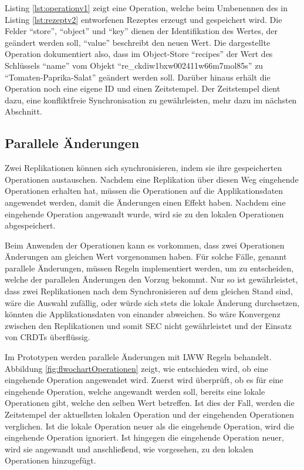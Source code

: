 \documentclass[a4paper, 12pt]{scrreprt}
\begin{document}
Listing \ref{lst:operationv1} zeigt eine Operation, welche beim Umbenennen des in Listing \ref{lst:rezeptv2} entworfenen Rezeptes erzeugt und gespeichert wird. Die Felder \enquote{store}, \enquote{object} und  \enquote{key} dienen der Identifikation des Wertes, der geändert werden soll, \enquote{value} beschreibt den neuen Wert. Die dargestellte Operation dokumentiert also, dass im Object-Store \enquote{recipes} der Wert des Schlüssels \enquote{name} vom Objekt \enquote{re\_ckdiw1bxw002411w66m7mol85s} zu \enquote{Tomaten-Paprika-Salat} geändert werden soll. Darüber hinaus erhält die Operation noch eine eigene ID und einen Zeitstempel. Der Zeitstempel dient dazu, eine konfliktfreie Synchronisation zu gewährleisten, mehr dazu im nächsten Abschnitt. 

\begin{minipage}{\linewidth}
	
\end{minipage}

\subsection{Parallele Änderungen}

Zwei Replikationen können sich synchronisieren, indem sie ihre gespeicherten Operationen austauschen. Nachdem eine Replikation über diesen Weg eingehende Operationen erhalten hat, müssen die Operationen auf die Applikationsdaten angewendet werden, damit die Änderungen einen Effekt haben. Nachdem eine eingehende Operation angewandt wurde, wird sie zu den lokalen Operationen abgespeichert.

Beim Anwenden der Operationen kann es vorkommen, dass zwei Operationen Änderungen am gleichen Wert vorgenommen haben. Für solche Fälle, genannt parallele Änderungen, müssen Regeln implementiert werden, um zu entscheiden, welche der parallelen Änderungen den Vorzug bekommt. Nur so ist gewährleistet, dass zwei Replikationen nach dem Synchronisieren auf dem gleichen Stand sind, wäre die Auswahl zufällig, oder würde sich stets die lokale Änderung durchsetzen, könnten die Applikationsdaten von einander abweichen. So wäre Konvergenz zwischen den Replikationen und somit \ac{SEC} nicht gewährleistet und der Einsatz von CRDTs überflüssig.

Im Prototypen werden parallele Änderungen mit \ac{LWW} Regeln behandelt. Abbildung \ref{fig:flwochartOperationen} zeigt, wie entschieden wird, ob eine eingehende Operation angewendet wird. Zuerst wird überprüft, ob es für eine eingehende Operation, welche angewandt werden soll, bereits eine lokale Operationen gibt, welche den selben Wert betreffen. Ist dies der Fall, werden die Zeitstempel der aktuellsten lokalen Operation und der eingehenden Operationen verglichen. Ist die lokale Operation neuer als die eingehende Operation, wird die eingehende Operation ignoriert. Ist hingegen die eingehende Operation neuer, wird sie angewandt und anschließend, wie vorgesehen, zu den lokalen Operationen hinzugefügt.
\end{document}

